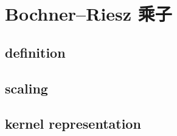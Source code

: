 \section{Bochner–Riesz 乘子}
\label{b2:sec:2401}


\subsection{definition}
\label{b2:subsec:240101}

\subsection{scaling}
\label{b2:subsec:240102}

\subsection{kernel representation}
\label{b2:subsec:240103}


